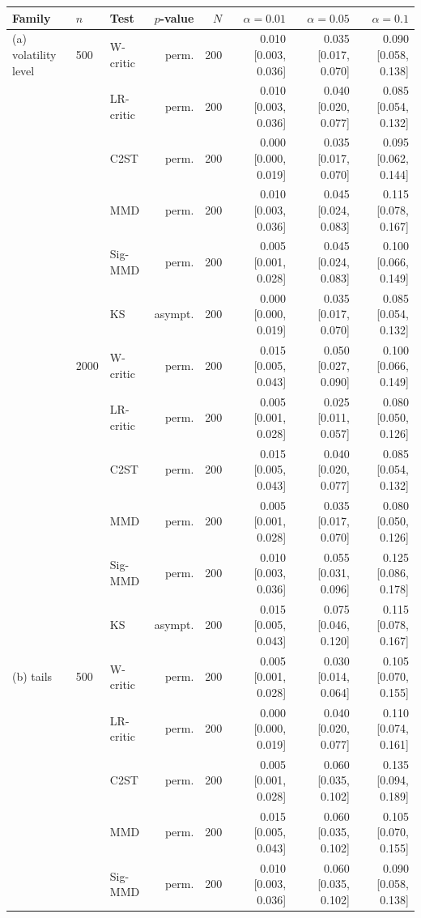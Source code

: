 \begin{tabular}{lllrrrrr}
\toprule
Family & $n$ & Test & $p$-value & $N$ & $\alpha=0.01$ & $\alpha=0.05$ & $\alpha=0.1$ \\
\midrule
(a) volatility level & 500 & W-critic & perm. & 200 & 0.010 [0.003, 0.036] & 0.035 [0.017, 0.070] & 0.090 [0.058, 0.138] \\
 &  & LR-critic & perm. & 200 & 0.010 [0.003, 0.036] & 0.040 [0.020, 0.077] & 0.085 [0.054, 0.132] \\
 &  & C2ST & perm. & 200 & 0.000 [0.000, 0.019] & 0.035 [0.017, 0.070] & 0.095 [0.062, 0.144] \\
 &  & MMD & perm. & 200 & 0.010 [0.003, 0.036] & 0.045 [0.024, 0.083] & 0.115 [0.078, 0.167] \\
 &  & Sig-MMD & perm. & 200 & 0.005 [0.001, 0.028] & 0.045 [0.024, 0.083] & 0.100 [0.066, 0.149] \\
 &  & KS & asympt. & 200 & 0.000 [0.000, 0.019] & 0.035 [0.017, 0.070] & 0.085 [0.054, 0.132] \\
 & 2000 & W-critic & perm. & 200 & 0.015 [0.005, 0.043] & 0.050 [0.027, 0.090] & 0.100 [0.066, 0.149] \\
 &  & LR-critic & perm. & 200 & 0.005 [0.001, 0.028] & 0.025 [0.011, 0.057] & 0.080 [0.050, 0.126] \\
 &  & C2ST & perm. & 200 & 0.015 [0.005, 0.043] & 0.040 [0.020, 0.077] & 0.085 [0.054, 0.132] \\
 &  & MMD & perm. & 200 & 0.005 [0.001, 0.028] & 0.035 [0.017, 0.070] & 0.080 [0.050, 0.126] \\
 &  & Sig-MMD & perm. & 200 & 0.010 [0.003, 0.036] & 0.055 [0.031, 0.096] & 0.125 [0.086, 0.178] \\
 &  & KS & asympt. & 200 & 0.015 [0.005, 0.043] & 0.075 [0.046, 0.120] & 0.115 [0.078, 0.167] \\
(b) tails & 500 & W-critic & perm. & 200 & 0.005 [0.001, 0.028] & 0.030 [0.014, 0.064] & 0.105 [0.070, 0.155] \\
 &  & LR-critic & perm. & 200 & 0.000 [0.000, 0.019] & 0.040 [0.020, 0.077] & 0.110 [0.074, 0.161] \\
 &  & C2ST & perm. & 200 & 0.005 [0.001, 0.028] & 0.060 [0.035, 0.102] & 0.135 [0.094, 0.189] \\
 &  & MMD & perm. & 200 & 0.015 [0.005, 0.043] & 0.060 [0.035, 0.102] & 0.105 [0.070, 0.155] \\
 &  & Sig-MMD & perm. & 200 & 0.010 [0.003, 0.036] & 0.060 [0.035, 0.102] & 0.090 [0.058, 0.138] \\

\end{tabular}
